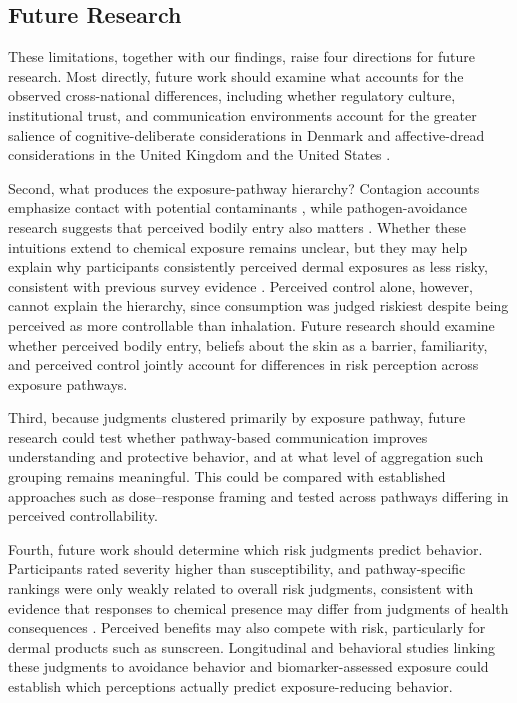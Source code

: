 \subsection{Future Research}
These limitations, together with our findings, raise four directions for future research. Most directly, future work should examine what accounts for the observed cross-national differences, including whether regulatory culture, institutional trust, and communication environments account for the greater salience of cognitive-deliberate considerations in Denmark and affective-dread considerations in the United Kingdom and the United States \citep{balog2020evolving, bearth2022social, clahsen2019countries}.

Second, what produces the exposure-pathway hierarchy? Contagion accounts emphasize contact with potential contaminants \citep{rozin1986operation, rozin1992magical, rozin2023magical}, while pathogen-avoidance research suggests that perceived bodily entry also matters \citep{white2025disgust}. Whether these intuitions extend to chemical exposure remains unclear, but they may help explain why participants consistently perceived dermal exposures as less risky, consistent with previous survey evidence \citep{matisane2022citizens}. Perceived control alone, however, cannot explain the hierarchy, since consumption was judged riskiest despite being perceived as more controllable than inhalation. Future research should examine whether perceived bodily entry, beliefs about the skin as a barrier, familiarity, and perceived control jointly account for differences in risk perception across exposure pathways.

Third, because judgments clustered primarily by exposure pathway, future research could test whether pathway-based communication improves understanding and protective behavior, and at what level of aggregation such grouping remains meaningful. This could be compared with established approaches such as dose--response framing \citep{bearth2021chemophobia} and tested across pathways differing in perceived controllability.

Fourth, future work should determine which risk judgments predict behavior. Participants rated severity higher than susceptibility, and pathway-specific rankings were only weakly related to overall risk judgments, consistent with evidence that responses to chemical presence may differ from judgments of health consequences \citep{jansen2020all}. Perceived benefits may also compete with risk, particularly for dermal products such as sunscreen. Longitudinal and behavioral studies linking these judgments to avoidance behavior and biomarker-assessed exposure could establish which perceptions actually predict exposure-reducing behavior.